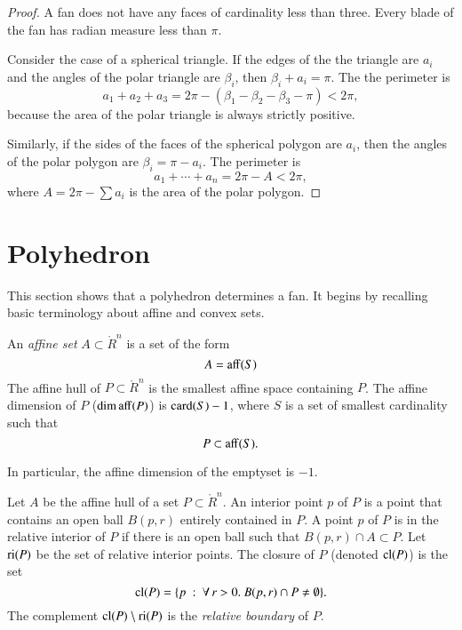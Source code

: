 \begin{proof} A fan does not have any faces of cardinality less than three.
Every blade of the fan has radian measure less than $\pi$.  

Consider the case of a spherical triangle.  If the edges of the
the triangle are $a_i$ and the angles of the polar
triangle are $\beta_i$, then $\beta_i+a_i=\pi$.
The the perimeter is 
$$a_1+a_2+a_3 = 2\pi - (\beta_1 -\beta_2 - \beta_3-\pi) < 2\pi,$$
because the area of the polar triangle is always strictly positive.

Similarly, if the sides of the faces of the spherical polygon are
$a_i$, then the angles of the polar polygon are $\beta_i = \pi-a_i$.
The perimeter is
$$
a_1+\cdots+a_n  = 2\pi- A< 2\pi,
$$
where $A = 2\pi-\sum a_i$ is the area of the polar polygon.
\end{proof}



\section{Polyhedron}

This section shows that a polyhedron determines a fan.  It begins by recalling basic terminology about affine and convex sets.

\begin{definition}
An  {\it affine set} $A\subset\ring{R}^n$ is a set of the form
$$
A={\operatorname{aff}}(S)
$$
The
affine hull of $P\subset\ring{R}^n$ is the smallest affine space containing $P$.  The affine dimension of $P$ ($\operatorname{dim\,aff}(P)$) is ${\operatorname{card}}(S)-1$, where $S$ is a set of smallest cardinality such that
$$
P \subset {\operatorname{aff}}(S).
$$
\end{definition}
In particular, the affine dimension of the emptyset is $-1$.

\begin{definition} Let $A$ be the affine hull of a set $P\subset\ring{R}^n$.    An interior point $p$ of $P$ is a point that contains an open ball $B(p,r)$ entirely contained in $P$.  A point $p$ of $P$ is in the relative interior of $P$ if there is an open ball such that $B(p,r) \cap A\subset P$.  Let ${\operatorname{ri}}(P)$ be the set of relative interior points.  The closure of $P$ (denoted ${\operatorname{cl}}(P)$)  is the set
$$
{\operatorname{cl}}(P) = \{p \ :\  \forall\,r >0.~ B(p,r) \cap P \ne \emptyset\}.
$$
The complement ${\operatorname{cl}}(P)\setminus {\operatorname{ri}}(P)$ is the {\it relative boundary} of $P$.
\end{definition}

